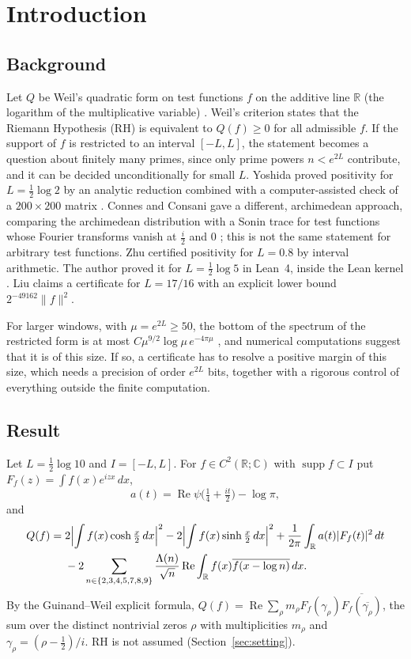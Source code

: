 \documentclass[11pt]{amsart}
\theoremstyle{remark}
\numberwithin{equation}{section}
\newcommand{\R}{\mathbb{R}}
\newcommand{\C}{\mathbb{C}}
\begin{document}
\section{Introduction}

\subsection{Background}
Let $Q$ be Weil's quadratic form on test functions $f$ on the additive line $\R$ (the logarithm of the multiplicative variable) \cite{Weil1952,Bombieri2000}. Weil's criterion states that the Riemann Hypothesis (RH) is equivalent to $Q(f)\ge0$ for all admissible $f$. If the support of $f$ is restricted to an interval $[-L,L]$, the statement becomes a question about finitely many primes, since only prime powers $n<e^{2L}$ contribute, and it can be decided unconditionally for small $L$. Yoshida proved positivity for $L=\frac12\log2$ by an analytic reduction combined with a computer-assisted check of a $200\times200$ matrix \cite{Yoshida1992}. Connes and Consani gave a different, archimedean approach, comparing the archimedean distribution with a Sonin trace for test functions whose Fourier transforms vanish at $\frac i2$ and $0$ \cite{CC20}; this is not the same statement for arbitrary test functions. Zhu \cite{Zhu2026} certified positivity for $L=0.8$ by interval arithmetic. The author proved it for $L=\frac12\log5$ in Lean~4, inside the Lean kernel \cite{MoriLog5}. Liu \cite{Liu2026} claims a certificate for $L=17/16$ with an explicit lower bound $2^{-49162}\|f\|^2$.

For larger windows, with $\mu=e^{2L}\ge50$, the bottom of the spectrum of the restricted form is at most $C\mu^{9/2}\log\mu\,e^{-4\pi\mu}$ \cite{MoriWeilV}, and numerical computations suggest that it is of this size. If so, a certificate has to resolve a positive margin of this size, which needs a precision of order $e^{2L}$ bits, together with a rigorous control of everything outside the finite computation.

\subsection{Result}
Let $L=\frac12\log10$ and $I=[-L,L]$. For $f\in C^2(\R;\C)$ with $\operatorname{supp}f\subset I$ put $F_f(z)=\int f(x)e^{izx}\,dx$,
\[
a(t)=\operatorname{Re}\psi\bigl(\tfrac14+\tfrac{it}2\bigr)-\log\pi,
\]
and
\begin{equation}\label{eq:Q}
\begin{aligned}
Q(f)={}&2\Bigl|\int f(x)\cosh\tfrac x2\,dx\Bigr|^2-2\Bigl|\int f(x)\sinh\tfrac x2\,dx\Bigr|^2
+\frac1{2\pi}\int_\R a(t)|F_f(t)|^2\,dt\\
&-2\sum_{n\in\{2,3,4,5,7,8,9\}}\frac{\Lambda(n)}{\sqrt n}\operatorname{Re}\int_\R f(x)\overline{f(x-\log n)}\,dx .
\end{aligned}
\end{equation}
By the Guinand--Weil explicit formula, $Q(f)=\operatorname{Re}\sum_\rho m_\rho F_f(\gamma_\rho)\overline{F_f(\overline{\gamma_\rho})}$, the sum over the distinct nontrivial zeros $\rho$ with multiplicities $m_\rho$ and $\gamma_\rho=(\rho-\frac12)/i$. RH is not assumed (Section~\ref{sec:setting}).
\end{document}
